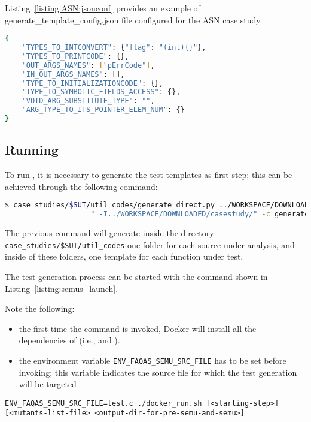 Listing~\ref{listing:ASN:jsonconf} provides an example of generate\_template\_config.json file configured for the ASN case study.

\begin{lstlisting}[language=bash,label=listing:ASN:jsonconf,caption=generate\_template\_config.json file for ASN case study.]
{
    "TYPES_TO_INTCONVERT": {"flag": "(int){}"},
    "TYPES_TO_PRINTCODE": {},
    "OUT_ARGS_NAMES": ["pErrCode"],
    "IN_OUT_ARGS_NAMES": [],
    "TYPE_TO_INITIALIZATIONCODE": {},
    "TYPE_TO_SYMBOLIC_FIELDS_ACCESS": {},
    "VOID_ARG_SUBSTITUTE_TYPE": "",
    "ARG_TYPE_TO_ITS_POINTER_ELEM_NUM": {}
}
\end{lstlisting}

\subsection{Running \SEMUS}
\label{sec:semuslaunch}

To run \SEMUS, it is necessary to generate the test templates as first step; this can be achieved through the following command:

\begin{lstlisting}[language=bash]
 $ case_studies/$SUT/util_codes/generate_direct.py ../WORKSPACE/DOWNLOADED/casestudy/test.c direct \
                    " -I../WORKSPACE/DOWNLOADED/casestudy/" -c generate_template_config.json

\end{lstlisting}

The previous command will generate inside the directory \texttt{case\_studies/\$SUT/util\_codes} one folder for each source under analysis, and inside of these folders, one template for each function under test.

The test generation process can be started with the command shown in Listing~\ref{listing:semus_launch}. 

Note the following:
\begin{itemize}
	\item the first time the command is invoked, Docker will install all the dependencies of \SEMUS (i.e., \SEMU and \MASS).
	\item the environment variable \texttt{ENV\_FAQAS\_SEMU\_SRC\_FILE} has to be set before invoking; this variable indicates the source file for which the test generation will be targeted
\end{itemize}

\begin{lstlisting}[language={}, label=listing:semus_launch]
ENV_FAQAS_SEMU_SRC_FILE=test.c ./docker_run.sh [<starting-step>] [<mutants-list-file> <output-dir-for-pre-semu-and-semu>]
\end{lstlisting}

